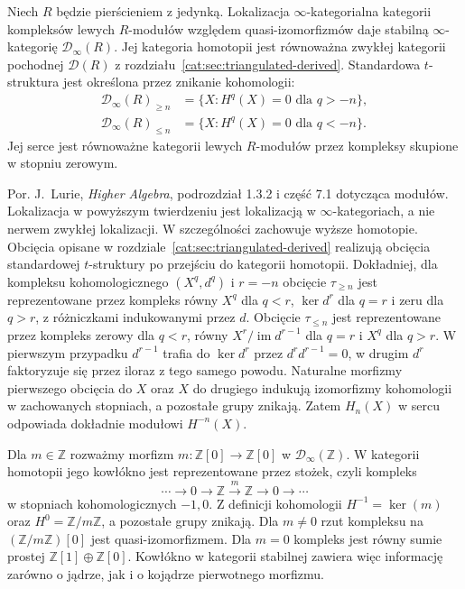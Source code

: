 \begin{twierdzenie}\label{cat:thm:stable-derived-infty}
Niech $R$ będzie pierścieniem z jedynką. Lokalizacja $\infty$-kategorialna kategorii kompleksów lewych $R$-modułów względem quasi-izomorfizmów daje stabilną $\infty$-kategorię $\mathcal D_\infty(R)$. Jej kategoria homotopii jest równoważna zwykłej kategorii pochodnej $\mathcal D(R)$ z rozdziału~\ref{cat:sec:triangulated-derived}. Standardowa $t$-struktura jest określona przez znikanie kohomologii:
\[
\begin{aligned}
 \mathcal D_\infty(R)_{\geq n}&=\{X:H^q(X)=0\text{ dla }q>-n\},\\
 \mathcal D_\infty(R)_{\leq n}&=\{X:H^q(X)=0\text{ dla }q<-n\}.
\end{aligned}
\]
Jej serce jest równoważne kategorii lewych $R$-modułów przez kompleksy skupione w stopniu zerowym.
\end{twierdzenie}
Por. J.~Lurie, \emph{Higher Algebra}, podrozdział 1.3.2 i część 7.1 dotycząca modułów. Lokalizacja w powyższym twierdzeniu jest lokalizacją w $\infty$-kategoriach, a nie nerwem zwykłej lokalizacji. W szczególności zachowuje wyższe homotopie. Obcięcia opisane w rozdziale~\ref{cat:sec:triangulated-derived} realizują obcięcia standardowej $t$-struktury po przejściu do kategorii homotopii. Dokładniej, dla kompleksu kohomologicznego $(X^q,d^q)$ i $r=-n$ obcięcie $\tau_{\geq n}$ jest reprezentowane przez kompleks równy $X^q$ dla $q<r$, $\ker d^r$ dla $q=r$ i zeru dla $q>r$, z różniczkami indukowanymi przez $d$. Obcięcie $\tau_{\leq n}$ jest reprezentowane przez kompleks zerowy dla $q<r$, równy $X^r/\operatorname{im}d^{r-1}$ dla $q=r$ i $X^q$ dla $q>r$. W pierwszym przypadku $d^{r-1}$ trafia do $\ker d^r$ przez $d^rd^{r-1}=0$, w drugim $d^r$ faktoryzuje się przez iloraz z tego samego powodu. Naturalne morfizmy pierwszego obcięcia do $X$ oraz $X$ do drugiego indukują izomorfizmy kohomologii w zachowanych stopniach, a pozostałe grupy znikają. Zatem $H_n(X)$ w sercu odpowiada dokładnie modułowi $H^{-n}(X)$.

\begin{przyklad}\label{cat:ex:stable-infty-multiplication}
Dla $m\in\mathbb Z$ rozważmy morfizm $m:\mathbb Z[0]\to\mathbb Z[0]$ w $\mathcal D_\infty(\mathbb Z)$. W kategorii homotopii jego kowłókno jest reprezentowane przez stożek, czyli kompleks
\[
 \cdots\to0\to\mathbb Z\xrightarrow{m}\mathbb Z\to0\to\cdots
\]
w stopniach kohomologicznych $-1,0$. Z definicji kohomologii $H^{-1}=\ker(m)$ oraz $H^0=\mathbb Z/m\mathbb Z$, a pozostałe grupy znikają. Dla $m\ne0$ rzut kompleksu na $(\mathbb Z/m\mathbb Z)[0]$ jest quasi-izomorfizmem. Dla $m=0$ kompleks jest równy sumie prostej $\mathbb Z[1]\oplus\mathbb Z[0]$. Kowłókno w kategorii stabilnej zawiera więc informację zarówno o jądrze, jak i o kojądrze pierwotnego morfizmu.
\end{przyklad}

